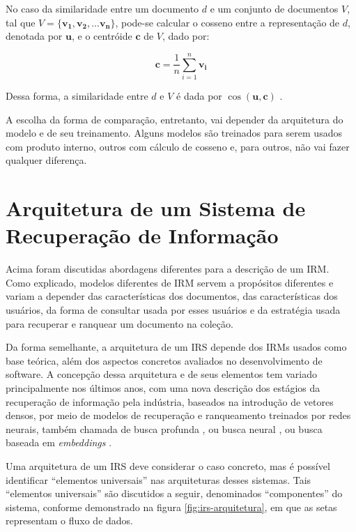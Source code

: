 \documentclass[
	12pt,				%
	openright,			%
	oneside,			%
	a4paper,			%
	english,			%
	french,				%
	spanish,			%
	brazil				%
	]{abntex2}
\begin{document}
No caso da similaridade entre um documento $d$ e um conjunto de documentos $V$, tal que $V = \{\mathbf{v_1}, \mathbf{v_2}, ... \mathbf{v_n}\}$,
pode-se calcular o cosseno entre a representação de $d$, denotada por $\mathbf{u}$, e o centróide $\mathbf{c}$ de $V$, dado por:

\begin{equation}
\mathbf{c} = \frac{1}{n} \sum_{i=1}^{n} \mathbf{v_i}
\label{eq:centroid}
\end{equation}

Dessa forma, a similaridade entre $d$ e $V$ é dada por $\cos⁡ (\mathbf{u},\mathbf{c})$ .

A escolha da forma de comparação, entretanto, vai depender da arquitetura do modelo e de seu treinamento. Alguns modelos são treinados para serem usados com produto interno, outros com cálculo de cosseno e, para outros, não vai fazer qualquer diferença.


\section{Arquitetura de um Sistema de Recuperação de Informação}
\label{sec:arquitetura-de-um-sistema-de-recuperacao-de-informacao}

Acima foram discutidas abordagens diferentes para a descrição de um IRM.
Como explicado, modelos diferentes de IRM servem a propósitos diferentes e variam a depender das
características dos documentos, das características dos usuários, da forma de consultar usada por esses usuários e da estratégia usada para recuperar e ranquear um documento
na coleção.

Da forma semelhante, a arquitetura de um IRS depende dos IRMs usados como base teórica, além dos aspectos concretos
avaliados no desenvolvimento de software.
A concepção dessa arquitetura e de seus elementos tem variado principalmente nos últimos anos,
com uma nova descrição dos estágios da recuperação de informação pela indústria,
baseados na introdução de vetores densos, por meio de modelos de recuperação e ranqueamento treinados por redes neurais, também chamada de busca profunda \cite{}, ou busca neural \cite{}, ou busca baseada em \textit{embeddings} \cite{}.

Uma arquitetura de um IRS deve considerar o caso concreto, mas é possível identificar ``elementos
universais'' nas arquiteturas desses sistemas.
Tais ``elementos universais'' são discutidos a seguir, denominados ``componentes'' do sistema, conforme demonstrado na figura \ref{fig:irs-arquitetura},
em que as setas representam o fluxo de dados.
\end{document}
